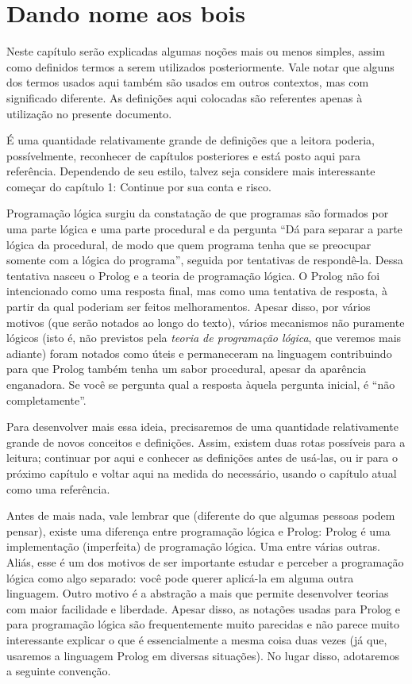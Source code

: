 \documentclass{article}
\theoremstyle{definition}
\theoremstyle{remark}
\begin{document}
\section{Dando nome aos bois}

Neste capítulo serão explicadas algumas noções mais ou menos simples, assim como definidos termos a serem utilizados posteriormente. Vale notar que alguns dos termos usados aqui também são usados em outros contextos, mas com significado diferente. As definições aqui colocadas são referentes apenas à utilização no presente documento.\par
É uma quantidade relativamente grande de definições que a leitora poderia, possívelmente, reconhecer de capítulos posteriores e está posto aqui para referência. Dependendo de seu estilo, talvez seja considere mais interessante começar do capítulo 1: Continue por sua conta e risco.

Programação lógica surgiu da constatação de que programas são formados por uma parte lógica e uma parte procedural e da pergunta ``Dá para separar a parte lógica da procedural, de modo que quem programa tenha que se preocupar somente com a lógica do programa'', seguida por tentativas de respondê-la. Dessa tentativa nasceu o Prolog e a teoria de programação lógica. O Prolog não foi intencionado como uma resposta final, mas como uma tentativa de resposta, à partir da qual poderiam ser feitos
melhoramentos. Apesar disso, por vários motivos (que serão notados ao longo do texto), vários mecanismos não puramente lógicos (isto é, não previstos pela \textit{teoria de programação lógica}, que veremos mais adiante) foram notados como úteis e permaneceram na linguagem contribuindo para que Prolog também tenha um sabor procedural, apesar da aparência enganadora. Se você se pergunta qual a resposta àquela pergunta inicial, é ``não completamente''.\par

Para desenvolver mais essa ideia, precisaremos de uma quantidade relativamente grande de novos conceitos e definições. Assim, existem duas rotas possíveis para a leitura; continuar por aqui e conhecer as definições antes de usá-las, ou ir para o próximo capítulo e voltar aqui na medida do necessário, usando o capítulo atual como uma referência.


Antes de mais nada, vale lembrar que (diferente do que algumas pessoas podem pensar), existe uma diferença entre programação lógica e Prolog: Prolog é uma implementação (imperfeita) de programação lógica. Uma entre várias outras. Aliás, esse é um dos motivos de ser importante estudar e perceber a programação lógica como algo separado: você pode querer aplicá-la em alguma outra linguagem. Outro motivo é a abstração a mais que permite desenvolver teorias com maior facilidade e liberdade. Apesar
disso, as notações usadas para Prolog e para programação lógica são frequentemente muito parecidas e não parece muito interessante explicar o que é essencialmente a mesma coisa duas vezes (já que, usaremos a linguagem Prolog em diversas situações). No lugar disso, adotaremos a seguinte convenção.
\end{document}
